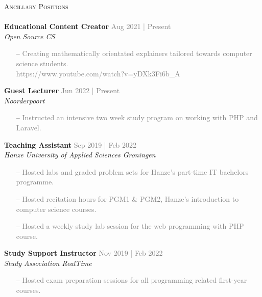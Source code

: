 \documentclass[a4paper]{article}
\newcommand{\lineunder} {
    \vspace*{-8pt} \\
    \hspace*{-18pt} \hrulefill \\
}
\newcommand{\header} [1] {
    {\hspace*{-18pt}\vspace*{6pt} \textsc{#1}}
    \vspace*{-6pt} \lineunder
}
\begin{document}
\vspace{5mm}

\header{Ancillary Positions}
\vspace{1mm}
\textbf{Educational Content Creator} \hfill \textcolor{gray}{Aug 2021 | Present}\\
\textit{Open Source CS}\\
\vspace{-2mm}
\begin{itemize} \itemsep 1pt
	\item[--] \textcolor{gray}{Creating mathematically orientated explainers tailored towards computer science students.}\\
		\textcolor{gray}{https://www.youtube.com/watch?v=yDXk3Fi6b\_A}
\end{itemize}
\textbf{Guest Lecturer} \hfill \textcolor{gray}{Jun 2022 | Present}\\
\textit{Noorderpoort}\\
\vspace{-2mm}
\begin{itemize} \itemsep 1pt
	\item[--] \textcolor{gray}{Instructed an intensive two week study program on working with PHP and Laravel.}
\end{itemize}
\textbf{Teaching Assistant} \hfill \textcolor{gray}{Sep 2019 | Feb 2022}\\
\textit{Hanze University of Applied Sciences Groningen}\\
\vspace{-2mm}
\begin{itemize} \itemsep 1pt
	\item[--] \textcolor{gray}{Hosted labs and graded problem sets for Hanze’s part-time IT bachelors programme.}
	\item[--] \textcolor{gray}{Hosted recitation hours for PGM1 \& PGM2, Hanze’s introduction to computer science courses.}
	\item[--] \textcolor{gray}{Hosted a weekly study lab session for the web programming with PHP course.}
\end{itemize}
\textbf{Study Support Instructor} \hfill \textcolor{gray}{Nov 2019 | Feb 2022}\\
\textit{Study Association RealTime}\\
\vspace{-2mm}
\begin{itemize} \itemsep 1pt
	\item[--] \textcolor{gray}{Hosted exam preparation sessions for all programming related first-year courses.}
\end{itemize}
\end{document}

